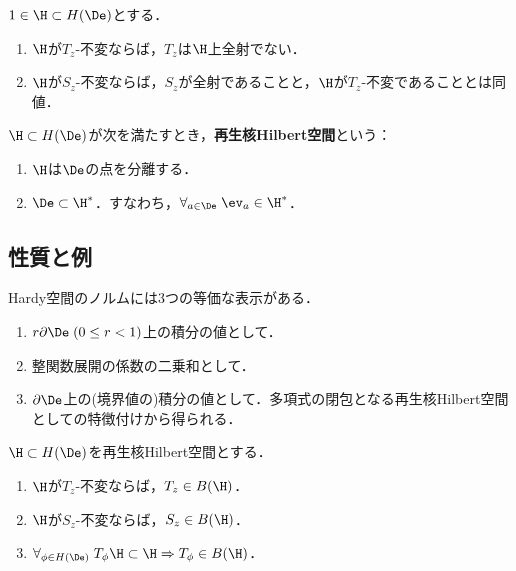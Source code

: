 \documentclass[uplatex,dvipdfmx]{jsreport}
\begin{document}
\begin{proposition}
    $1\in\H\subset H(\De)$とする．
    \begin{enumerate}
        \item $\H$が$T_z$-不変ならば，$T_z$は$\H$上全射でない．
        \item $\H$が$S_z$-不変ならば，$S_z$が全射であることと，$\H$が$T_z$-不変であることとは同値．
    \end{enumerate}
\end{proposition}

\begin{definition}
    $\H\subset H(\De)$が次を満たすとき，\textbf{再生核Hilbert空間}という：
    \begin{enumerate}
        \item $\H$は$\De$の点を分離する．
        \item $\De\subset\H^*$．すなわち，$\forall_{a\in\De}\;\ev_a\in\H^*$．
    \end{enumerate}
\end{definition}

\subsection{性質と例}

\begin{tcolorbox}[colframe=ForestGreen, colback=ForestGreen!10!white,breakable,colbacktitle=ForestGreen!40!white,coltitle=black,fonttitle=\bfseries\sffamily,
title=]
    Hardy空間のノルムには3つの等価な表示がある．
    \begin{enumerate}
        \item $r\partial\De\;(0\le r<1)$上の積分の値として．
        \item 整関数展開の係数の二乗和として．
        \item $\partial\De$上の(境界値の)積分の値として．多項式の閉包となる再生核Hilbert空間としての特徴付けから得られる．
    \end{enumerate}
\end{tcolorbox}

\begin{proposition}[再生核Hilbert空間上の有界作用素になる条件]
    $\H\subset H(\De)$を再生核Hilbert空間とする．
    \begin{enumerate}
        \item $\H$が$T_z$-不変ならば，$T_z\in B(\H)$．
        \item $\H$が$S_z$-不変ならば，$S_z\in B(\H)$．
        \item $\forall_{\phi\in H(\De)}\;T_\phi\H\subset\H\Rightarrow T_\phi\in B(\H)$．
    \end{enumerate}
\end{proposition}
\end{document}
